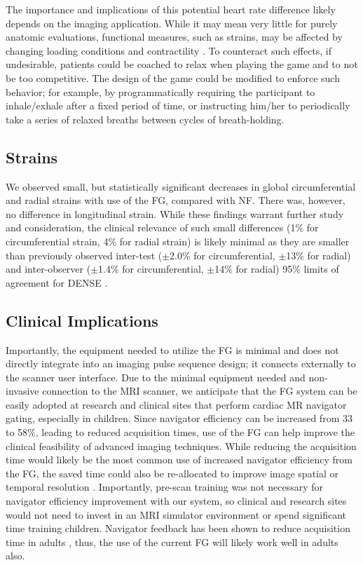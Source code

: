 		The importance and implications of this potential heart rate difference likely depends on the imaging application. While it may mean very little for purely anatomic evaluations, functional measures, such as strains, may be affected by changing loading conditions and contractility \cite{Boettler2005}. To counteract such effects, if undesirable, patients could be coached to relax when playing the game and to not be too competitive. The design of the game could be modified to enforce such behavior; for example, by programmatically requiring the participant to inhale/exhale after a fixed period of time, or instructing him/her to periodically take a series of relaxed breaths between cycles of breath-holding.
	
	\subsection{Strains}
		We observed small, but statistically significant decreases in global circumferential and radial strains with use of the FG, compared with NF. There was, however, no difference in longitudinal strain. While these findings warrant further study and consideration, the clinical relevance of such small differences (1\% for circumferential strain, 4\% for radial strain) is likely minimal as they are smaller than previously observed inter-test ($\pm$2.0\% for circumferential, $\pm$13\% for radial) and inter-observer ($\pm$1.4\% for circumferential, $\pm$14\% for radial) 95\% limits of agreement for DENSE \cite{Wehner2015,Wehner2015a}.
	
	\subsection{Clinical Implications}
		Importantly, the equipment needed to utilize the FG is minimal and does not directly integrate into an imaging pulse sequence design; it connects externally to the scanner user interface. Due to the minimal equipment needed and non-invasive connection to the MRI scanner, we anticipate that the FG system can be easily adopted at research and clinical sites that perform cardiac MR navigator gating, especially in children. Since navigator efficiency can be increased from 33 to 58\%, leading to reduced acquisition times, use of the FG can help improve the clinical feasibility of advanced imaging techniques. While reducing the acquisition time would likely be the most common use of increased navigator efficiency from the FG, the saved time could also be re-allocated to improve image spatial or temporal resolution \cite{Feuerlein2009}. Importantly, pre-scan training was not necessary for navigator efficiency improvement with our system, so clinical and research sites would not need to invest in an MRI simulator environment or spend significant time training children. Navigator feedback has been shown to reduce acquisition time in adults \cite{Feuerlein2009}, thus, the use of the current FG will likely work well in adults also.
		
